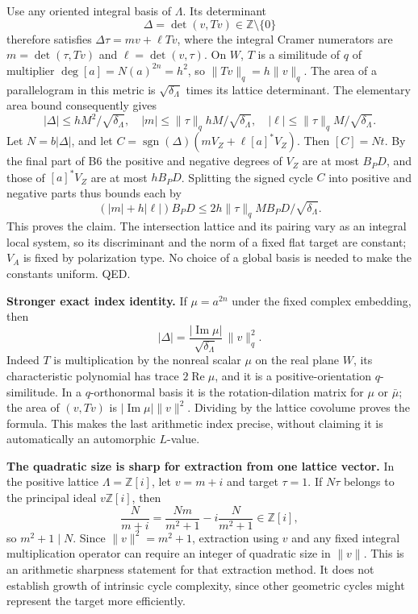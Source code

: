 \documentclass[11pt,a4paper]{article}
\theoremstyle{definition}
\begin{document}
Use any oriented integral basis of \(\Lambda\). Its determinant \[
 \Delta=\det(v,Tv)\in\mathbb Z\setminus\{0\}
\] therefore satisfies \(\Delta\tau=m v+\ell Tv\), where the integral Cramer numerators are \(m=\det(\tau,Tv)\) and \(\ell=\det(v,\tau)\). On \(W\), \(T\) is a similitude of \(q\) of multiplier \(\deg[a]=N(a)^{2n}=h^2\), so \(\|Tv\|_q=h\|v\|_q\). The area of a parallelogram in this metric is \(\sqrt{\delta_\Lambda}\) times its lattice determinant. The elementary area bound consequently gives \[
 |\Delta|\leq hM^2/\sqrt{\delta_\Lambda},\quad
 |m|\leq\|\tau\|_q hM/\sqrt{\delta_\Lambda},\quad
 |\ell|\leq\|\tau\|_q M/\sqrt{\delta_\Lambda}.
\] Let \(N=b|\Delta|\), and let \(C=\operatorname{sgn}(\Delta)(mV_Z+\ell[a]^*V_Z)\). Then \([C]=Nt\). By the final part of B6 the positive and negative degrees of \(V_Z\) are at most \(B_PD\), and those of \([a]^*V_Z\) are at most \(hB_PD\). Splitting the signed cycle \(C\) into positive and negative parts thus bounds each by \[
 (|m|+h|\ell|)B_PD\leq 2h\|\tau\|_q M B_PD/\sqrt{\delta_\Lambda}.
\] This proves the claim. The intersection lattice and its pairing vary as an integral local system, so its discriminant and the norm of a fixed flat target are constant; \(V_A\) is fixed by polarization type. No choice of a global basis is needed to make the constants uniform. QED.

\textbf{Stronger exact index identity.} If \(\mu=a^{2n}\) under the fixed complex embedding, then \[
 |\Delta|=\frac{|\operatorname{Im}\mu|}{\sqrt{\delta_\Lambda}}\,\|v\|_q^2.
\] Indeed \(T\) is multiplication by the nonreal scalar \(\mu\) on the real plane \(W\), its characteristic polynomial has trace \(2\operatorname{Re}\mu\), and it is a positive-orientation \(q\)-similitude. In a \(q\)-orthonormal basis it is the rotation-dilation matrix for \(\mu\) or \(\bar\mu\); the area of \((v,Tv)\) is \(|\operatorname{Im}\mu|\|v\|^2\). Dividing by the lattice covolume proves the formula. This makes the last arithmetic index precise, without claiming it is automatically an automorphic \(L\)-value.

\textbf{The quadratic size is sharp for extraction from one lattice vector.} In the positive lattice \(\Lambda=\mathbb Z[i]\), let \(v=m+i\) and target \(\tau=1\). If \(N\tau\) belongs to the principal ideal \(v\mathbb Z[i]\), then \[
 \frac{N}{m+i}=\frac{Nm}{m^2+1}-i\frac{N}{m^2+1}\in\mathbb Z[i],
\] so \(m^2+1\mid N\). Since \(\|v\|^2=m^2+1\), extraction using \(v\) and any fixed integral multiplication operator can require an integer of quadratic size in \(\|v\|\). This is an arithmetic sharpness statement for that extraction method. It does not establish growth of intrinsic cycle complexity, since other geometric cycles might represent the target more efficiently.
\end{document}
